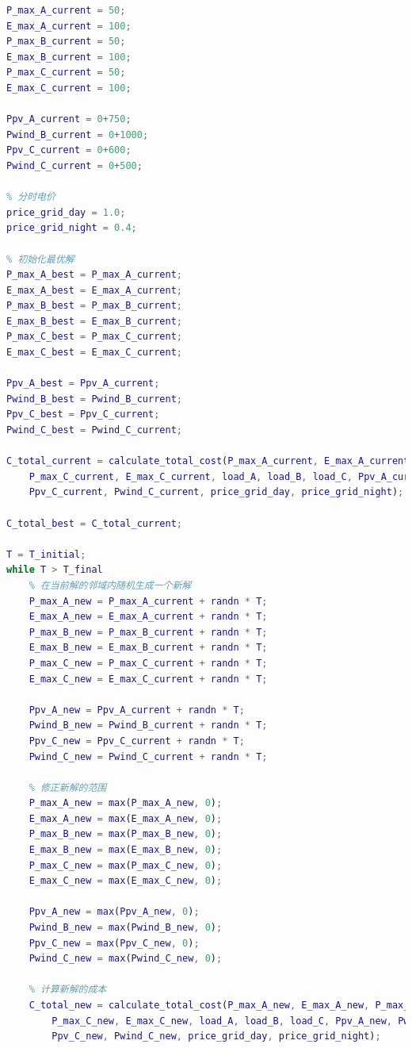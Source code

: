 \documentclass{cumcmthesis}
\begin{document}
\begin{appendices}
\begin{lstlisting}[language=Matlab]
% 初始发电参数
P_max_A_current = 50;
E_max_A_current = 100;
P_max_B_current = 50;
E_max_B_current = 100;
P_max_C_current = 50;
E_max_C_current = 100;

Ppv_A_current = 0+750;
Pwind_B_current = 0+1000;
Ppv_C_current = 0+600;
Pwind_C_current = 0+500;

% 分时电价
price_grid_day = 1.0;
price_grid_night = 0.4;

% 初始化最优解
P_max_A_best = P_max_A_current;
E_max_A_best = E_max_A_current;
P_max_B_best = P_max_B_current;
E_max_B_best = E_max_B_current;
P_max_C_best = P_max_C_current;
E_max_C_best = E_max_C_current;

Ppv_A_best = Ppv_A_current;
Pwind_B_best = Pwind_B_current;
Ppv_C_best = Ppv_C_current;
Pwind_C_best = Pwind_C_current;

C_total_current = calculate_total_cost(P_max_A_current, E_max_A_current, P_max_B_current, E_max_B_current, ...
    P_max_C_current, E_max_C_current, load_A, load_B, load_C, Ppv_A_current, Pwind_B_current, ...
    Ppv_C_current, Pwind_C_current, price_grid_day, price_grid_night);

C_total_best = C_total_current;

T = T_initial;
while T > T_final
    % 在当前解的邻域内随机生成一个新解
    P_max_A_new = P_max_A_current + randn * T;
    E_max_A_new = E_max_A_current + randn * T;
    P_max_B_new = P_max_B_current + randn * T;
    E_max_B_new = E_max_B_current + randn * T;
    P_max_C_new = P_max_C_current + randn * T;
    E_max_C_new = E_max_C_current + randn * T;

    Ppv_A_new = Ppv_A_current + randn * T;
    Pwind_B_new = Pwind_B_current + randn * T;
    Ppv_C_new = Ppv_C_current + randn * T;
    Pwind_C_new = Pwind_C_current + randn * T;

    % 修正新解的范围
    P_max_A_new = max(P_max_A_new, 0);
    E_max_A_new = max(E_max_A_new, 0);
    P_max_B_new = max(P_max_B_new, 0);
    E_max_B_new = max(E_max_B_new, 0);
    P_max_C_new = max(P_max_C_new, 0);
    E_max_C_new = max(E_max_C_new, 0);

    Ppv_A_new = max(Ppv_A_new, 0);
    Pwind_B_new = max(Pwind_B_new, 0);
    Ppv_C_new = max(Ppv_C_new, 0);
    Pwind_C_new = max(Pwind_C_new, 0);

    % 计算新解的成本
    C_total_new = calculate_total_cost(P_max_A_new, E_max_A_new, P_max_B_new, E_max_B_new, ...
        P_max_C_new, E_max_C_new, load_A, load_B, load_C, Ppv_A_new, Pwind_B_new, ...
        Ppv_C_new, Pwind_C_new, price_grid_day, price_grid_night);


\end{lstlisting}
\end{appendices}
\end{document}
